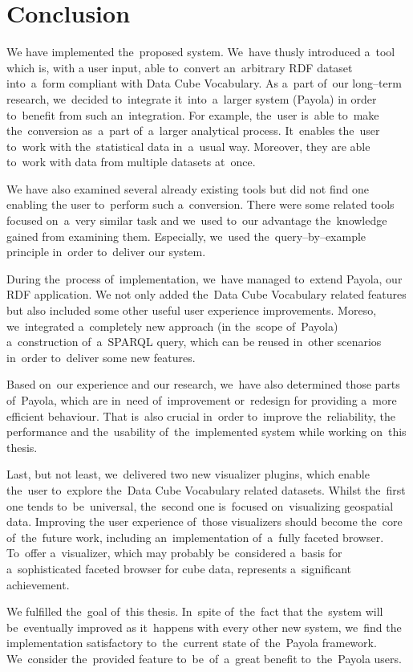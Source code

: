 \chapter*{Conclusion}

We have implemented the~proposed system. We~have thusly introduced a~tool which is, with
a user input, able to~convert an~arbitrary RDF dataset into~a~form compliant with Data Cube Vocabulary.
As a~part of~our long--term research, we~decided to~integrate it~into~a~larger system (Payola)
in order to~benefit from such an~integration.
For example, the~user is~able to~make the~conversion as~a~part of~a~larger 
analytical process. It~enables the~user to~work with the~statistical data in~a~usual way. Moreover, they are able to~work with data from multiple datasets at~once.

We have also examined several already existing tools but did not find one enabling
the user to~perform such a~conversion. There were some related tools 
focused on~a~very similar task and we~used to~our advantage the~knowledge gained from
examining them. Especially, we~used the~query--by--example principle in~order to~deliver our system.

During the~process of~implementation, we~have managed to~extend Payola, our RDF application. 
We not only added the~Data Cube Vocabulary related features but also included some 
other useful user experience improvements. Moreso, we~integrated a~completely 
new approach (in the~scope of~Payola) a~construction of~a~SPARQL query, which can 
be reused in~other scenarios in~order to~deliver some new features.

Based on~our experience and our research, we~have also determined those parts of~Payola, which are in~need of~improvement or~redesign for providing a~more 
efficient behaviour. That is~also crucial in~order to~improve the~reliability, 
the performance and the~usability of~the~implemented system while working on~this 
thesis.

Last, but not least, we~delivered two new visualizer plugins, which enable the~user to~explore the~Data Cube Vocabulary related datasets. Whilst the~first one tends to~be~universal, the~second one is~focused on~visualizing geospatial data. Improving 
the user experience of~those visualizers should become the~core of~the~future work, 
including an~implementation of~a~fully faceted browser. To~offer a~visualizer,
which may probably be~considered a~basis for a~sophisticated faceted browser for cube data,
represents a~significant achievement.

We fulfilled the~goal of~this thesis. In~spite of~the~fact that the~system will be~eventually improved
as it~happens with every other new system, we~find
the implementation satisfactory to~the~current state of~the~Payola framework. We~consider the~provided feature to~be~of~a~great benefit to~the~Payola users.
